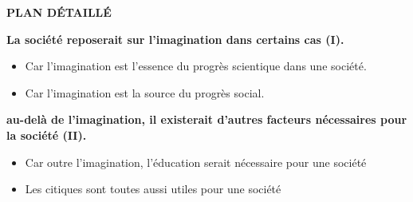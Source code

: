 \newpage \begin{center}
	\textbf{PLAN D\'ETAILL\'E}
\end{center}

\noindent \textbf{La société reposerait sur l'imagination dans certains cas (I).}
\begin{itemize}
	\item Car l'imagination est l'essence du progrès scientique dans une société.
	\item Car l'imagination est la source du  progrès social.
\end{itemize}

\noindent \textbf{au-delà de l'imagination, il existerait d'autres facteurs nécessaires pour la société (II).}

\begin{itemize}
	\item Car outre l'imagination, l'éducation serait nécessaire pour une société
	\item Les citiques sont toutes aussi utiles pour une société
\end{itemize}